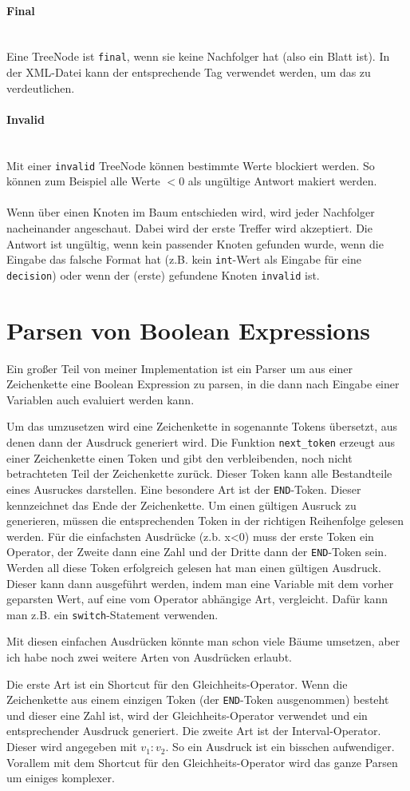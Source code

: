\documentclass[a4paper,12pt]{article}
\newcommand{\myparagraph}[1]{\paragraph*{#1}\mbox{}\\}
\begin{document}
\myparagraph{Final}
Eine TreeNode ist \texttt{final}, wenn sie keine Nachfolger hat (also ein Blatt ist). In der XML-Datei kann der entsprechende Tag verwendet werden, um das zu verdeutlichen.

\myparagraph{Invalid}
Mit einer \texttt{invalid} TreeNode können bestimmte Werte blockiert werden. So können zum Beispiel alle Werte $<0$ als ungültige Antwort makiert werden.
\\
\\
Wenn über einen Knoten im Baum entschieden wird, wird jeder Nachfolger nacheinander angeschaut. Dabei wird der erste Treffer wird akzeptiert. Die Antwort ist ungültig, wenn kein passender Knoten gefunden wurde, wenn die Eingabe das falsche Format hat (z.B. kein \texttt{int}-Wert als Eingabe für eine \texttt{decision}) oder wenn der (erste) gefundene Knoten \texttt{invalid} ist. 

\section*{Parsen von Boolean Expressions}
Ein großer Teil von meiner Implementation ist ein Parser um aus einer Zeichenkette eine Boolean Expression zu parsen, in die dann nach Eingabe einer Variablen auch evaluiert werden kann.

Um das umzusetzen wird eine Zeichenkette in sogenannte Tokens übersetzt, aus denen dann der Ausdruck generiert wird. 
Die Funktion \verb+next_token+ erzeugt aus einer Zeichenkette einen Token und gibt den verbleibenden, noch nicht betrachteten Teil der Zeichenkette zurück. Dieser Token kann alle Bestandteile eines Ausruckes darstellen. Eine besondere Art ist der \texttt{END}-Token. Dieser kennzeichnet das Ende der Zeichenkette.
Um einen gültigen Ausruck zu generieren, müssen die entsprechenden Token in der richtigen Reihenfolge gelesen werden. 
Für die einfachsten Ausdrücke (z.b. x<0) muss der erste Token ein Operator, der Zweite dann eine Zahl und der Dritte dann der \texttt{END}-Token sein. Werden all diese Token erfolgreich gelesen hat man einen gültigen Ausdruck. Dieser kann dann ausgeführt werden, indem man eine Variable mit dem vorher geparsten Wert, auf eine vom Operator abhängige Art, vergleicht. Dafür kann man z.B. ein \texttt{switch}-Statement verwenden.

Mit diesen einfachen Ausdrücken könnte man schon viele Bäume umsetzen, aber ich habe noch zwei weitere Arten von Ausdrücken erlaubt.

Die erste Art ist ein Shortcut für den Gleichheits-Operator. Wenn die Zeichenkette aus einem einzigen Token (der \texttt{END}-Token ausgenommen) besteht und dieser eine Zahl ist, wird der Gleichheits-Operator verwendet und ein entsprechender Ausdruck generiert. 
Die zweite Art ist der Interval-Operator. Dieser wird angegeben mit $v_1:v_2$. So ein Ausdruck ist ein bisschen aufwendiger. Vorallem mit dem Shortcut für den Gleichheits-Operator wird das ganze Parsen um einiges komplexer.
\end{document}
